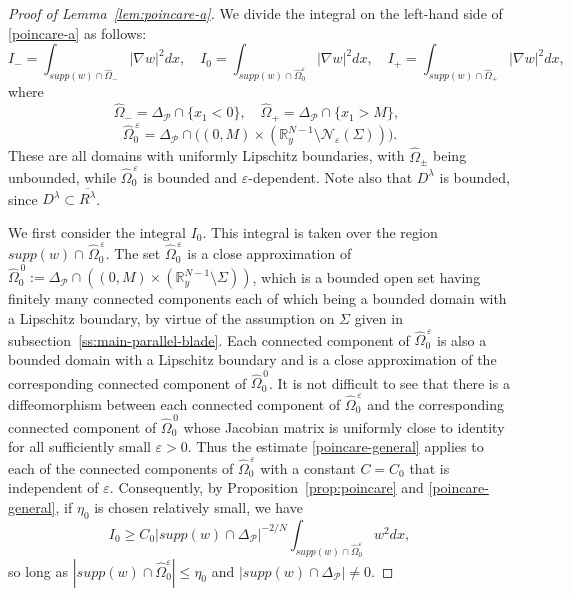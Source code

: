 \documentclass[a4paper,12pt,fullpage]{article}
\numberwithin{equation}{section}
\def\R{{\mathbb R}}
\def\ep{\varepsilon}
\begin{document}
\begin{proof}[Proof of Lemma~\ref{lem:poincare-a}]
We divide the integral on the left-hand side of \eqref{poincare-a} as follows:
\[
I_{-}=\int_{supp(w)\cap \widehat\Omega_{-}}|\nabla w|^2 dx,\quad
I_{0}=\int_{supp(w)\cap \widehat\Omega^{\ep}_{0}}|\nabla w|^2 dx,\quad
I_{+}=\int_{supp(w)\cap \widehat\Omega_{+}}|\nabla w|^2 dx,
\]
where
\[
\widehat\Omega_{-}=\Delta_{\mathcal P}\cap\{x_1<0\},\quad
\widehat\Omega_{+}=\Delta_{\mathcal P}\cap\{x_1>M\},\ \ 
\]
\[
\widehat\Omega^{\,\ep}_{0}=\Delta_{\mathcal P}\cap\big((0,M)\times \left(\R^{N-1}_y\setminus{\mathcal N}_\ep(\Sigma)\right)\big).
\]
These are all domains with uniformly Lipschitz boundaries, with $\widehat\Omega_{\pm}$ being unbounded, while $\widehat\Omega^{\,\ep}_{0}$ is bounded and $\ep$-dependent.  Note also that $D^\lambda$ is bounded, since $D^\lambda\subset\overline{R^\lambda}$. 

We first consider the integral $I_0$. This integral is taken over the region $supp(w)\cap\hspace{1pt} \widehat\Omega^{\,\ep}_{0}$. The set $\widehat\Omega^{\,\ep}_{0}$ is a close approximation of $\widehat\Omega^{\,0}_{0}:=\Delta_{\mathcal P}\cap\left((0,M)\times \left(\R^{N-1}_y\setminus\Sigma\right)\right)$, which is a bounded open set having finitely many connected components each of which being a bounded domain with a Lipschitz boundary, by virtue of the assumption on $\Sigma$ given in subsection~\ref{ss:main-parallel-blade}. Each connected component of $\widehat\Omega^{\,\ep}_{0}$ is also a bounded domain with a Lipschitz boundary and is a close approximation of the corresponding connected component of $\widehat\Omega^{\,0}_{0}$. It is not difficult to see that there is a diffeomorphism between each connected component of $\widehat\Omega^{\,\ep}_{0}$ and the corresponding connected component of $\widehat\Omega^{\,0}_{0}$ whose Jacobian matrix is uniformly close to identity for all sufficiently small $\ep>0$. Thus the estimate \eqref{poincare-general} applies to each of the connected components of $\widehat\Omega^{\,\ep}_{0}$ with a constant $C=C_0$ that is independent of $\ep$. Consequently, by Proposition~\ref{prop:poincare} and \eqref{poincare-general}, if $\eta_0$ is chosen relatively small, we have
\begin{equation}\label{I0}
I_0\geq C_0 |supp(w)\cap\Delta_{\mathcal P}|^{-2/N}\int_{supp(w)\cap \widehat\Omega^{\ep}_{0}} w^2 dx,
\end{equation}
so long as $|supp(w)\cap\widehat\Omega^{\ep}_{0}|\leq \eta_0$ and $|supp(w)\cap\Delta_{\mathcal P}|\ne 0$.


\end{proof}
\end{document}
